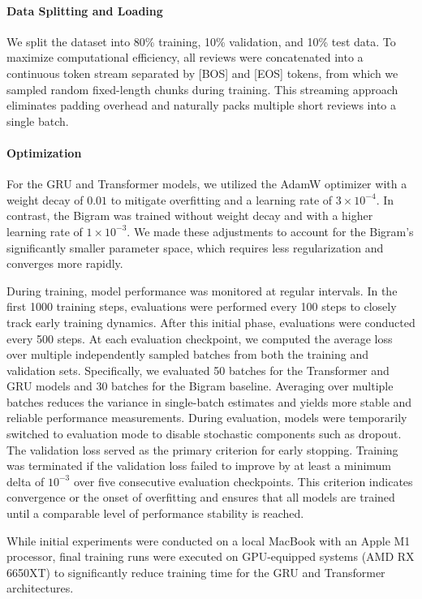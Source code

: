 \paragraph{Data Splitting and Loading}
We split the dataset into 80\% training, 10\% validation, and 10\% test data.
To maximize computational efficiency, all reviews were concatenated into a continuous token stream separated by [BOS] and [EOS] tokens, from which we sampled random fixed-length chunks during training.
This streaming approach eliminates padding overhead and naturally packs multiple short reviews into a single batch.

\paragraph{Optimization}
For the GRU and Transformer models, we utilized the AdamW optimizer with a weight decay of $0.01$ to mitigate overfitting and a learning rate of $3 \times 10^{-4}$.
In contrast, the Bigram was trained without weight decay and with a higher learning rate of $1 \times 10^{-3}$.
We made these adjustments to account for the Bigram's significantly smaller parameter space, which requires less regularization and converges more rapidly.

During training, model performance was monitored at regular intervals.
In the first 1000 training steps, evaluations were performed every 100 steps to closely track early training dynamics.
After this initial phase, evaluations were conducted every 500 steps.
At each evaluation checkpoint, we computed the average loss over multiple independently sampled batches from both the training and validation sets. 
Specifically, we evaluated 50 batches for the Transformer and GRU models and 30 batches for the Bigram baseline.
Averaging over multiple batches reduces the variance in single-batch estimates and yields more stable and reliable performance measurements.
During evaluation, models were temporarily switched to evaluation mode to disable stochastic components such as dropout.
The validation loss served as the primary criterion for early stopping.
Training was terminated if the validation loss failed to improve by at least a minimum delta of $10^{-3}$ over five consecutive evaluation checkpoints.
This criterion indicates convergence or the onset of overfitting and ensures that all models are trained until a comparable level of performance stability is reached.

While initial experiments were conducted on a local MacBook with an Apple M1 processor, final training runs were executed on GPU-equipped systems (AMD RX 6650XT) to significantly reduce training time for the GRU and Transformer architectures.
